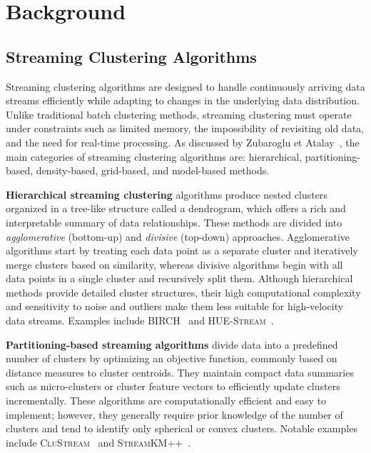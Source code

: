 \chapter{Background}\label{ch:background}

\section{Streaming Clustering Algorithms}\label{sec:streaming_clustering_algorithms}

Streaming clustering algorithms are designed to handle continuously arriving
data streams efficiently while adapting to changes in the underlying data
distribution. Unlike traditional batch clustering methods, streaming clustering
must operate under constraints such as limited memory, the impossibility of
revisiting old data, and the need for real-time processing. As discussed by
Zubaroglu et Atalay~\cite{streaming_clustering_review}, the main categories of
streaming clustering algorithms are: hierarchical, partitioning-based,
density-based, grid-based, and model-based methods.

\textbf{Hierarchical streaming clustering} algorithms produce nested clusters organized
in a tree-like structure called a dendrogram, which offers a rich and interpretable
summary of data relationships. These methods are divided into \textit{agglomerative} (bottom-up)
and \textit{divisive} (top-down) approaches. Agglomerative algorithms start by treating
each data point as a separate cluster and iteratively merge clusters based on similarity,
whereas divisive algorithms begin with all data points in a single cluster and recursively
split them. Although hierarchical methods provide detailed cluster structures, their high
computational complexity and sensitivity to noise and outliers make them less suitable for
high-velocity data streams. Examples include \textsc{BIRCH}~\cite{birch} and
\textsc{HUE-Stream}~\cite{hue_stream}.

\textbf{Partitioning-based streaming algorithms} divide data into a predefined number of clusters
by optimizing an objective function, commonly based on distance measures to cluster centroids. They
maintain compact data summaries such as micro-clusters or cluster feature vectors to efficiently update
clusters incrementally. These algorithms are computationally efficient and easy to implement; however,
they generally require prior knowledge of the number of clusters and tend to identify only spherical
or convex clusters. Notable examples include \textsc{CluStream}~\cite{clustream} and
\textsc{StreamKM++}~\cite{stream_km_plus_plus}.

